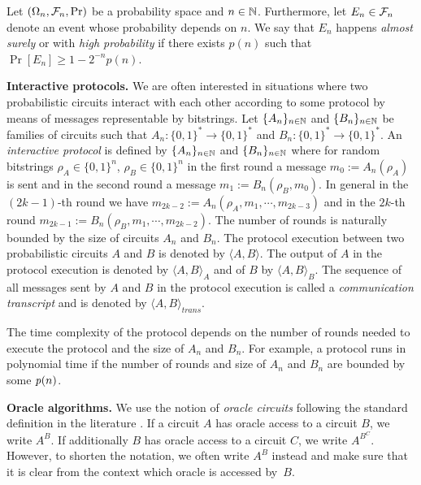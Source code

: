 Let $(\Omega_n, \mathcal{F}_n, \Pr)$ be a probability space and $n \in \mathbb{N}$.
Furthermore, let $E_n \in \mathcal{F}_n$ denote an event whose probability depends on $n$.
We say that $E_n$ happens \textit{almost surely} or with \textit{high probability} if
there exists $p(n)$ such that $\Pr[E_n] \geq 1 - 2^{-n} \mathit{p}(n)$.

\textbf{Interactive protocols.}
We are often interested in situations where two probabilistic circuits interact with
each other according to some protocol by means of messages representable by bitstrings.
Let $\{A_n\}_{n \in \mathbb{N}}$ and $\{B_n\}_{n \in \mathbb{N}}$ be families of circuits such that $A_n : \{0,1\}^{*} \rightarrow \{0,1\}^{*}$ and $B_n : \{0,1\}^{*} \rightarrow \{0,1\}^{*}$.
An \textit{interactive protocol} is defined by $\{A_n\}_{n \in \mathbb{N}}$ and $\{B_n\}_{n \in \mathbb{N}}$ where
for random bitstrings $\rho_A \in \{0,1\}^{n}$, $\rho_B \in \{0,1\}^{n}$ in the first round a message $m_0 := A_n(\rho_A)$ is sent and in the second round a message $m_1 := B_n(\rho_B, m_0)$.
In general in the $(2k\!-\!1)$-th round we have $m_{2k-2} := A_n(\rho_A, m_1, \cdots, m_{2k-3})$ and in the $2k$-th round $m_{2k-1} := B_n(\rho_B, m_1, \cdots, m_{2k-2})$.
The number of rounds is naturally bounded by the size of circuits $A_n$ and $B_n$.
The protocol execution between two probabilistic circuits $A$ and $B$ is denoted by $\langle A, B \rangle$.
The output of $A$ in the protocol execution is denoted by $\langle A, B \rangle_A$ and of $B$ by $\langle A, B \rangle_B$.
The sequence of all messages sent by $A$ and $B$ in the protocol execution is called a \textit{communication transcript} and
is denoted by $\langle A, B \rangle_{\mathit{trans}}$.

The time complexity of the protocol depends on the number of rounds needed to execute the protocol
and the size of $A_n$ and $B_n$. For example, a protocol runs in polynomial time if
the number of rounds and size of $A_n$ and $B_n$ are bounded by some $\operatorname{\mathit{p}}(n)$.

\textbf{Oracle algorithms.}
We use the notion of \textit{oracle circuits} following the standard definition in the literature \cite{Goldreich:2004:FCV:975541}.
If a circuit $A$ has oracle access to a circuit $B$, we write $A^B$. If additionally $B$ has oracle access to a circuit $C$,
we write $A^{B^C}$. However, to shorten the notation, we often write $A^{B}$ instead and make sure that it is clear from
the context which oracle is accessed by~$B$.

